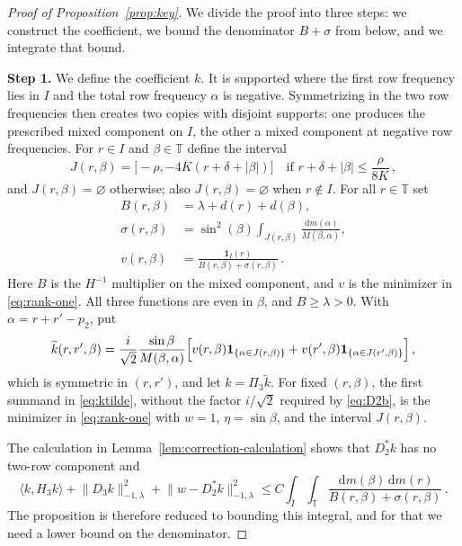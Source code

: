 \documentclass[11pt]{amsart}
\theoremstyle{plain}
\theoremstyle{definition}
\newcommand{\T}{\mathbb T}
\newcommand{\1}{\mathbf 1}
\newcommand{\ip}[2]{\langle #1,#2\rangle}
\newcommand{\norm}[1]{\lVert #1\rVert}
\newcommand{\abs}[1]{\lvert #1\rvert}
\newcommand{\dd}{\,\mathrm d}
\newcommand{\Hminus}[1]{\norm{#1}_{-1,\lambda}}
\begin{document}
\begin{proof}[Proof of Proposition~\ref{prop:key}]
We divide the proof into three steps: we construct the coefficient, we bound
the denominator $B+\sigma$ from below, and we integrate that bound.

\noindent\textbf{Step 1.}  We define the coefficient $k$.  It is supported where the
first row frequency lies in $I$ and the total row frequency $\alpha$ is
negative.  Symmetrizing in the two row frequencies then creates two copies
with disjoint supports: one produces the prescribed mixed component on $I$,
the other a mixed component at negative row frequencies.
For $r\in I$ and $\beta\in\T$ define the interval
\[
  J(r,\beta)=\bigl[-\rho,-4K(r+\delta+\abs\beta)\bigr]
  \quad\text{if } r+\delta+\abs\beta\leq\frac\rho{8K}\, ,
\]
and $J(r,\beta)=\varnothing$ otherwise; also $J(r,\beta)=\varnothing$ when
$r\notin I$.  For all $r\in\T$ set
\begin{align}
  B(r,\beta)&=\lambda+d(r)+d(\beta),\label{eq:B}\\
  \sigma(r,\beta)&=\sin^2 (\beta)\int_{J(r,\beta)}\frac{\dd m(\alpha)}{M(\beta,\alpha)},
    \label{eq:sigma}\\
  v(r,\beta)&=\frac{\1_I(r)}{B(r,\beta)+\sigma(r,\beta)}\, .\label{eq:v}
\end{align}
Here $B$ is the $H^{-1}$ multiplier on the mixed component, and $v$ is the
minimizer in \eqref{eq:rank-one}.  All three
functions are even in $\beta$, and $B\geq\lambda>0$.  With
$\alpha=r+r'-p_2$, put
\begin{equation}\label{eq:ktilde}
  \widetilde k(r,r',\beta)=\frac i{\sqrt2}\frac{\sin\beta}{M(\beta,\alpha)}
   \Bigl[v(r,\beta)\1_{\{\alpha\in J(r,\beta)\}}
        +v(r',\beta)\1_{\{\alpha\in J(r',\beta)\}}\Bigr]\, ,
\end{equation}
which is symmetric in $(r,r')$, and let $k=\Pi_3\widetilde k$.
For fixed $(r,\beta)$, the first summand in \eqref{eq:ktilde}, without the
factor $i/\sqrt2$ required by \eqref{eq:D2b}, is the minimizer in
\eqref{eq:rank-one} with $w=1$, $\eta=\sin\beta$, and the interval
$J(r,\beta)$.

The calculation in Lemma~\ref{lem:correction-calculation} shows that
$D_2^*k$ has no two-row component and
\begin{equation}\label{eq:reduce}
  \ip k{H_3k}+\Hminus{D_3k}^2+\Hminus{w-D_2^*k}^2
  \leq C\int_I\int_\T
  \frac{\dd m(\beta)\dd m(r)}{B(r,\beta)+\sigma(r,\beta)}\, .
\end{equation}
The proposition is therefore reduced to bounding this integral, and for that
we need a lower bound on the denominator.


\end{proof}
\end{document}
